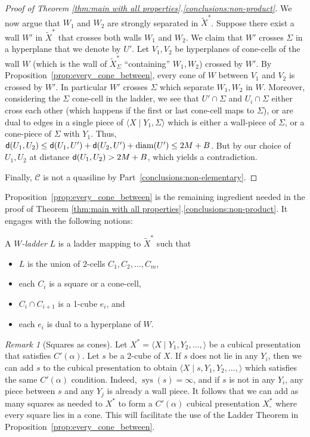 \documentclass[12pt,oneside]{amsart}
\theoremstyle{definition}
\theoremstyle{definition}
\theoremstyle{remark}
\newtheorem{rem}[thm]{Remark}
\newcommand{\dist}{\textup{\textsf{d}}}
\DeclareMathOperator{\diam}{\text{diam}}
\DeclareMathOperator{\sys}{\mathrm sys}
\begin{document}
\begin{proof}[Proof of Theorem \ref{thm:main with all properties}.\eqref{conclusions:non-product}]
We now argue that $W_1$ and $W_2$ are strongly separated in $\widetilde X^*$.
Suppose there exist a wall $W'$ in $\widetilde X^*$ that crosses both walls $W_1$ and $W_2$. We claim that $W'$ crosses $\Sigma$ in a hyperplane that we denote by $U'$. Let $V_1, V_2$ be hyperplanes of cone-cells of the wall $W$ (which is the wall of $\widetilde X^*_{\Sigma}$ ``containing'' $W_1, W_2$) crossed by $W'$. 
By Proposition~\ref{prop:every_cone_between}, every cone of $W$ between $V_1$ and $V_2$ is crossed by $W'$. In particular $W'$ crosses $\Sigma$ which separate $W_1,W_2$ in $W$.
%
Moreover, considering the $\Sigma$ cone-cell in the ladder, we see that $U'\cap \Sigma$ and $U_i\cap \Sigma$ either cross each other (which  happens if 
the first or last cone-cell maps to  $\Sigma$), or are dual to edges in a single piece of $\langle X\mid Y_1, \Sigma\rangle$ which is either a  wall-piece of $\Sigma$, or  a  cone-piece of $\Sigma$ with $Y_1$.
Thus, $\dist(U_1, U_2)\leq \dist(U_1, U')+\dist(U_2, U')+\diam(U')\leq 2M+B$. But by our choice of $U_1, U_2$ at distance $\dist(U_1, U_2)> 2M+B$, which yields a contradiction.

Finally,  $\mathcal{C}$ is not a quasiline  by Part~\eqref{conclusions:non-elementary}.
\end{proof}



Proposition~\ref{prop:every_cone_between}  is the remaining ingredient needed in the proof of Theorem \ref{thm:main with all properties}.\eqref{conclusions:non-product}. 
It engages with the following notions:

A \emph{$W$-ladder} $L$ is a ladder mapping to $\widetilde X^*$
such that 
\begin{itemize}
\item $L$ is the union of $2$-cells $C_1,C_2,\ldots, C_m$,
\item each $C_i$ is  a square or a cone-cell,
\item $C_i\cap C_{i+1}$ is a 1-cube $e_i$, and
\item each $e_i$ is dual to a hyperplane of $W$.
\end{itemize}


\begin{rem}[Squares as cones]\label{rem:add squares}
Let $X^*=\langle X \mid Y_1, Y_2, \ldots, \rangle$ be a cubical presentation that satisfies $C'(\alpha)$.
Let $s$ be a 2-cube of $X$. If $s$ does not lie in any $Y_i$, then we can add $s$ to the cubical presentation
to obtain
$\langle X \mid s, Y_1,Y_2,\ldots, \rangle$
which satisfies the same $C'(\alpha)$ condition.
Indeed, $\sys(s)=\infty$, and if  $s$ is not  in any $Y_i$,
 any piece between $s$ and any $Y_j$ is already a wall piece. It follows that we can add as many squares as needed to $X^*$ to form a $C'(\alpha)$ cubical presentation $X^*_\square$ where every square lies in a cone. This will facilitate the use of the Ladder Theorem in Proposition~\ref{prop:every_cone_between}. 
\end{rem}
\end{document}
